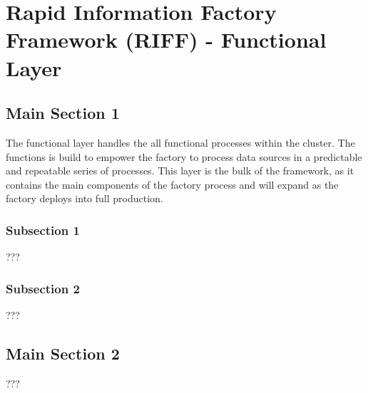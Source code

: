 
\chapter{Rapid Information Factory Framework (RIFF) - Functional Layer} %

\label{Chapter05} %



\section{Main Section 1}

The functional layer handles the all functional processes within the cluster.
The functions is build to empower the factory to process data sources in a predictable and repeatable series of processes.
This layer is the bulk of the framework, as it contains the main components of the factory process and will expand as the factory deploys into full production.

\subsection{Subsection 1}

???


\subsection{Subsection 2}

???


\section{Main Section 2}

???
